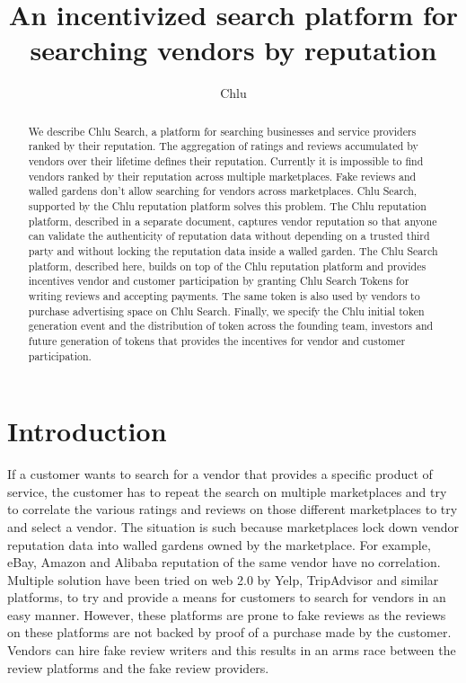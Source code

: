 \documentclass[a4paper]{article}
\title{An incentivized search platform for searching vendors by reputation}
\author{
  Chlu
}
\begin{document}
\maketitle

\begin{abstract}

  We describe Chlu Search, a platform for searching businesses and
  service providers ranked by their reputation. The aggregation of
  ratings and reviews accumulated by vendors over their lifetime
  defines their reputation. Currently it is impossible to find vendors
  ranked by their reputation across multiple marketplaces. Fake
  reviews and walled gardens don't allow searching for vendors across
  marketplaces. Chlu Search, supported by the Chlu reputation platform
  solves this problem. The Chlu reputation platform, described in a
  separate document, captures vendor reputation so that anyone can
  validate the authenticity of reputation data without depending on a
  trusted third party and without locking the reputation data inside a
  walled garden. The Chlu Search platform, described here, builds on
  top of the Chlu reputation platform and provides incentives vendor
  and customer participation by granting Chlu Search Tokens for
  writing reviews and accepting payments. The same token is also used
  by vendors to purchase advertising space on Chlu Search. Finally, we
  specify the Chlu initial token generation event and the distribution
  of token across the founding team, investors and future generation
  of tokens that provides the incentives for vendor and customer
  participation.

\end{abstract}

\section{Introduction}

If a customer wants to search for a vendor that provides a specific
product of service, the customer has to repeat the search on multiple
marketplaces and try to correlate the various ratings and reviews on
those different marketplaces to try and select a vendor. The situation
is such because marketplaces lock down vendor reputation data into
walled gardens owned by the marketplace. For example, eBay, Amazon and
Alibaba reputation of the same vendor have no correlation. Multiple
solution have been tried on web 2.0 by Yelp, TripAdvisor and similar
platforms, to try and provide a means for customers to search for
vendors in an easy manner. However, these platforms are prone to fake
reviews as the reviews on these platforms are not backed by proof of a
purchase made by the customer. Vendors can hire fake review writers
and this results in an arms race between the review platforms and the
fake review providers.
\end{document}
